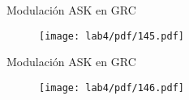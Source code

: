 \begin{frame}{Modulación ASK en GRC}
\begin{figure}[H]
\centering
\texttt{[image: lab4/pdf/145.pdf]}
\end{figure}
\end{frame}

\begin{frame}{Modulación ASK en GRC}
\begin{figure}[H]
\centering
\texttt{[image: lab4/pdf/146.pdf]}
\end{figure}
\end{frame}